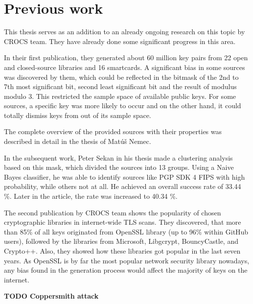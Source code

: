 \chapter{Previous work}

This thesis serves as an addition to an already ongoing research on this topic by CROCS team. They have already done some significant progress in this area. 

In their first publication\cite{svenda_1}, they generated about 60 million key pairs from 22 open and closed-source libraries and 16 smartcards. A significant bias in some sources was discovered by them, which could be reflected in the bitmask of the 2nd to 7th most significant bit, second least significant bit and the result of modulus modulo 3. This restricted the sample space of available public keys. For some sources, a specific key was more likely to occur and on the other hand, it could totally dismiss keys from out of its sample space.

The complete overview of the provided sources with their properties was described in detail in the thesis of Mat\'{u}š Nemec\cite{thesis_matus_nemec}.

In the subsequent work, Peter Sekan in his thesis\cite{thesis_sekan} made a clustering analysis based on this mask, which divided the sources into 13 groups. Using a Naive Bayes classifier, he was able to identify sources like PGP SDK 4 FIPS with high probability, while others not at all. He achieved an overall success rate of 33.44 \%. Later in the article, the rate was increased to 40.34 \%.

The second publication by CROCS team\cite{svenda_3} shows the popularity of chosen cryptographic libraries in internet-wide TLS scans. They discovered, that more than 85\% of all keys originated from OpenSSL library (up to 96\% within GitHub users), followed by the libraries from Microsoft, Libgcrypt, BouncyCastle, and Crypto++. Also, they showed how these libraries got popular in the last seven years. As OpenSSL is by far the most popular network security library nowadays, any bias found in the generation process would affect the majority of keys on the internet.

\textbf{TODO Coppersmith attack} \cite{svenda_2}

